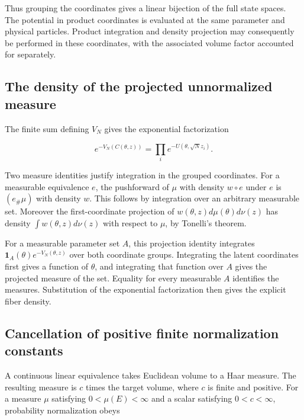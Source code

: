 \documentclass[11pt,a4paper]{article}
\begin{document}
Thus grouping the coordinates gives a linear bijection of the full state spaces. The potential in product coordinates is evaluated at the same parameter and physical particles. Product integration and density projection may consequently be performed in these coordinates, with the associated volume factor accounted for separately.



\subsection{\texorpdfstring{The density of the projected unnormalized measure}{The density of the projected unnormalized measure}}


The finite sum defining \(V_N\) gives the exponential factorization

\[e^{-V_N(C(\theta,z))}=\prod_i e^{-U(\theta,\sqrt N z_i)}.\]

Two measure identities justify integration in the grouped coordinates. For a measurable equivalence \(e\), the pushforward of \(\mu\) with density \(w\circ e\) under \(e\) is \((e_\#\mu)\) with density \(w\). This follows by integration over an arbitrary measurable set. Moreover the first-coordinate projection of \(w(\theta,z)d\mu(\theta)d\nu(z)\) has density \(\int w(\theta,z)d\nu(z)\) with respect to \(\mu\), by Tonelli’s theorem.



For a measurable parameter set \(A\), this projection identity integrates \(\mathbf 1_A(\theta)e^{-V_N(\theta,z)}\) over both coordinate groups. Integrating the latent coordinates first gives a function of \(\theta\), and integrating that function over \(A\) gives the projected measure of the set. Equality for every measurable \(A\) identifies the measures. Substitution of the exponential factorization then gives the explicit fiber density.



\subsection{\texorpdfstring{Cancellation of positive finite normalization constants}{Cancellation of positive finite normalization constants}}


A continuous linear equivalence takes Euclidean volume to a Haar measure. The resulting measure is \(c\) times the target volume, where \(c\) is finite and positive. For a measure \(\mu\) satisfying \(0<\mu(E)<\infty\) and a scalar satisfying \(0<c<\infty\), probability normalization obeys
\end{document}
